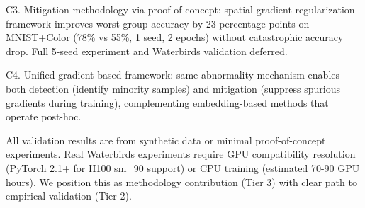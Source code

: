C3. Mitigation methodology via proof-of-concept: spatial gradient regularization framework improves worst-group accuracy by 23 percentage points on MNIST+Color (78\% vs 55\%, 1 seed, 2 epochs) without catastrophic accuracy drop. Full 5-seed experiment and Waterbirds validation deferred.

C4. Unified gradient-based framework: same abnormality mechanism enables both detection (identify minority samples) and mitigation (suppress spurious gradients during training), complementing embedding-based methods that operate post-hoc.

All validation results are from synthetic data or minimal proof-of-concept experiments. Real Waterbirds experiments require GPU compatibility resolution (PyTorch 2.1+ for H100 sm\_90 support) or CPU training (estimated 70-90 GPU hours). We position this as methodology contribution (Tier 3) with clear path to empirical validation (Tier 2).
